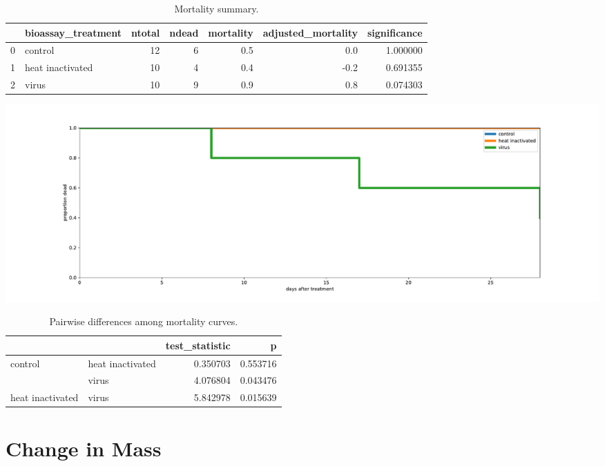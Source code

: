 \documentclass[11pt]{scrartcl}
\begin{document}
   \begin{table}[h!]
       \centering
       \caption{Mortality summary.}
       \begin{tabular}{llrrrrr}
\toprule
{} & bioassay\_treatment &  ntotal &  ndead &  mortality &  adjusted\_mortality &  significance \\
\midrule
0 &            control &      12 &      6 &        0.5 &                 0.0 &      1.000000 \\
1 &   heat inactivated &      10 &      4 &        0.4 &                -0.2 &      0.691355 \\
2 &              virus &      10 &      9 &        0.9 &                 0.8 &      0.074303 \\
\bottomrule
\end{tabular}

   \end{table}

   \begin{center}
        \includegraphics[width=\textwidth]{survivorshipfig.pdf}
   \end{center}


   
       \begin{table}[h!]
       \centering
       \caption{Pairwise differences among mortality curves.}
   \begin{tabular}{llrr}
\toprule
                 &       &  test\_statistic &         p \\
\midrule
control & heat inactivated &        0.350703 &  0.553716 \\
                 & virus &        4.076804 &  0.043476 \\
heat inactivated & virus &        5.842978 &  0.015639 \\
\bottomrule
\end{tabular}
\end{table} 
   
    \clearpage
    \section{Change in Mass}
\end{document}
